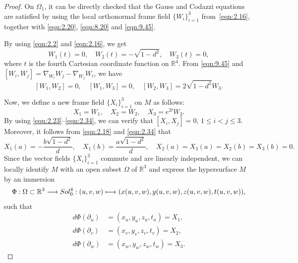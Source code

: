 \documentclass[10pt,a4paper]{amsart}
\begin{document}
	\begin{proof}
		On $\Omega_{1}$, it can be directly checked that the Gauss and Codazzi equations are satisfied by using the
		local orthonormal frame field $\{W_i\}_{i=1}^3$ from~\eqref{eqn:2.16}, together with \eqref{eqn:2.20}, \eqref{eqn:8.20}
		and \eqref{eqn:9.45}. 
		
		By using \eqref{eqn:2.2} and \eqref{eqn:2.16}, we get
		\begin{equation}\label{eqn:2.23}
			W_1(t)=0, \quad W_2(t)=-\sqrt{1-d^2}, \quad W_3(t)=0,
		\end{equation}
		where $t$ is the fourth Cartesian coordinate function on $\mathbb{R}^4$.
		From \eqref{eqn:9.45} and $[W_i,W_j]=\nabla_{W_i}W_j-\nabla_{W_j}W_i$, we have
		\begin{equation}\label{eqn:2.223}
			[W_1,W_2]=0, \quad [W_1,W_3]=0, \quad [W_2,W_3]=2\sqrt{1-d^2}W_3.
		\end{equation}
		
		Now, we define a new frame field $\{X_i\}_{i=1}^3$ on $M$ as follows:
		\begin{equation}\label{eqn:2.34}
			X_1=W_1, \quad X_2=W_2, \quad X_3=e^{2t}W_3.
		\end{equation}
		By using \eqref{eqn:2.23}--\eqref{eqn:2.34},
		we can verify that $[X_i,X_j]=0$, $1\leq i<j\leq3$.
		Moreover, it follows from \eqref{eqn:2.18} and \eqref{eqn:2.34} that
		\begin{equation}
			\label{eqn:2.31}    
			X_1(a)=-\frac{b\sqrt{1-d^2}}{d}, \quad
			X_1(b)=\frac{a\sqrt{1-d^2}}{d}, \quad
			X_2(a)=X_3(a)=X_2(b)=X_3(b)=0.
		\end{equation}
		Since the vector fields $\{X_i\}_{i=1}^3$ commute and are linearly independent, we can locally identify $M$ with an open subset $\Omega$ of $\mathbb{R}^3$
		and express the hypersurface $M$ by an immersion
		\begin{equation*}
			\begin{aligned}
				\Phi:\Omega\subset\mathbb{R}^3 \longrightarrow {\rm Sol_0^4}:
				(u,v,w) \longmapsto (x(u,v,w),y(u,v,w),z(u,v,w),t(u,v,w)),
			\end{aligned}
		\end{equation*}
		such that
		\begin{equation}\label{eqn:2.36}
			\begin{aligned}
				d\Phi(\partial_u)
				&=(x_u,y_u,
				z_u,t_u)=X_1,\\
				d\Phi(\partial_v)
				&=(x_v,y_v,
				z_v,t_v)=X_2,\\
				d\Phi(\partial_w)
				&=(x_w,y_w,
				z_w,t_w)=X_3.
			\end{aligned}
		\end{equation}
		

\end{proof}
\end{document}
